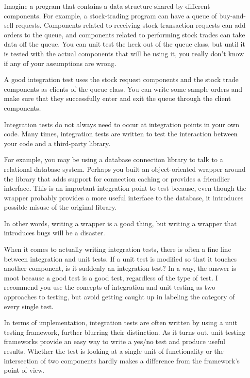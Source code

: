 
Imagine a program that contains a data structure shared by different components. For example, a stock-trading program can have a queue of buy-and-sell requests. Components related to receiving stock transaction requests can add orders to the queue, and components related to performing stock trades can take data off the queue. You can unit test the heck out of the queue class, but until it is tested with the actual components that will be using it, you really don’t know if any of your assumptions are wrong.

A good integration test uses the stock request components and the stock trade components as clients of the queue class. You can write some sample orders and make sure that they successfully enter and exit the queue through the client components.


Integration tests do not always need to occur at integration points in your own code. Many times, integration tests are written to test the interaction between your code and a third-party library.

For example, you may be using a database connection library to talk to a relational database system. Perhaps you built an object-oriented wrapper around the library that adds support for connection caching or provides a friendlier interface. This is an important integration point to test because, even though the wrapper probably provides a more useful interface to the database, it introduces possible misuse of the original library.

In other words, writing a wrapper is a good thing, but writing a wrapper that introduces bugs will be a disaster.


When it comes to actually writing integration tests, there is often a fine line between integration and unit tests. If a unit test is modified so that it touches another component, is it suddenly an integration test? In a way, the answer is moot because a good test is a good test, regardless of the type of test. I recommend you use the concepts of integration and unit testing as two approaches to testing, but avoid getting caught up in labeling the category of every single test.

In terms of implementation, integration tests are often written by using a unit testing framework, further blurring their distinction. As it turns out, unit testing frameworks provide an easy way to write a yes/no test and produce useful results. Whether the test is looking at a single unit of functionality or the intersection of two components hardly makes a difference from the framework’s point of view.

